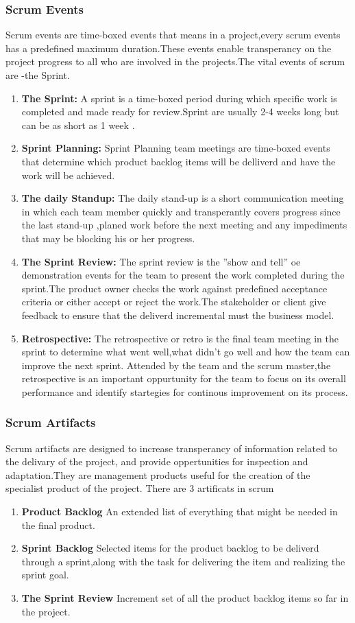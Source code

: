 \documentclass[a4paper, 12pt]{report}
\begin{document}
\subsubsection{ Scrum Events}
Scrum events are time-boxed events that means in a project,every scrum events has a predeﬁned maximum duration.These events enable transperancy on the project progress to all who are involved in the projects.The vital events of scrum are -the Sprint.
\begin{enumerate}
\item\textbf{ The Sprint: }A sprint is a time-boxed period during which speciﬁc work is completed and made ready for review.Sprint are usually 2-4 weeks long but can be as short as 1 week .
\item \textbf{Sprint Planning:} Sprint Planning team meetings are time-boxed events that determine which product backlog items will be delliverd and have the work will be achieved.
\item  \textbf{The daily Standup:} The daily stand-up is a short communication meeting in which each team member quickly and transperantly covers progress since the last stand-up ,planed work before the next meeting and any impediments that may be blocking his or her progress.
\item    \textbf{ The Sprint Review:} The sprint review is the ”show and tell” oe demonstration events for the team to present the work completed during the sprint.The product owner checks the work against predeﬁned acceptance criteria or either accept or reject the work.The stakeholder or client give feedback to ensure that the deliverd incremental must the business model.
\item  \textbf{Retrospective:} The retrospective or retro is the ﬁnal team meeting in the sprint to determine what went well,what didn’t go well and how the team can improve the next sprint. Attended by the team and the scrum master,the retrospective is an important oppurtunity for the team to focus on its overall performance and identify startegies for continous improvement on its process.
\end{enumerate}
 
 
 \subsubsection{Scrum Artifacts}
Scrum artifacts are designed to increase transperancy of information related to the delivary of the project, and provide oppertunities for inspection and adaptation.They are management products useful for the creation of the specialist product of the project. There are 3 artiﬁcats in scrum
\begin{enumerate}
\item \textbf{Product Backlog} An extended list of everything that might be needed in the ﬁnal product.
\item \textbf{Sprint Backlog}
Selected items for the product backlog to be deliverd through a sprint,along with the task for delivering the item and realizing the sprint goal.
\item  \textbf{The Sprint Review} Increment set of all the product backlog items so far in the project.
\end{enumerate}
 
\end{document}

